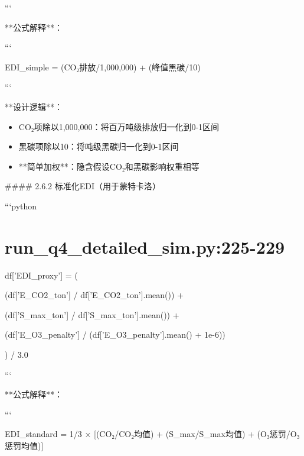 \documentclass[a4paper,12pt]{article}
\begin{document}
\par
```

\par
**公式解释**：

\par
```

\par
EDI\_simple = (CO₂排放/1,000,000) + (峰值黑碳/10)

\par
```

\par
**设计逻辑**：

\par
\begin{itemize}
\item CO₂项除以1,000,000：将百万吨级排放归一化到0-1区间
\end{itemize}
\begin{itemize}
\item 黑碳项除以10：将吨级黑碳归一化到0-1区间
\end{itemize}
\begin{itemize}
\item **简单加权**：隐含假设CO₂和黑碳影响权重相等
\end{itemize}
#### 2.6.2 标准化EDI（用于蒙特卡洛）

\par
```python

\par
\section{run_q4_detailed_sim.py:225-229}
df['EDI\_proxy'] = (

\par
(df['E\_CO2\_ton'] / df['E\_CO2\_ton'].mean()) +

\par
(df['S\_max\_ton'] / df['S\_max\_ton'].mean()) +

\par
(df['E\_O3\_penalty'] / (df['E\_O3\_penalty'].mean() + 1e-6))

\par
) / 3.0

\par
```

\par
**公式解释**：

\par
```

\par
EDI\_standard = 1/3 × [(CO₂/CO₂均值) + (S\_max/S\_max均值) + (O₃惩罚/O₃惩罚均值)]
\end{document}
